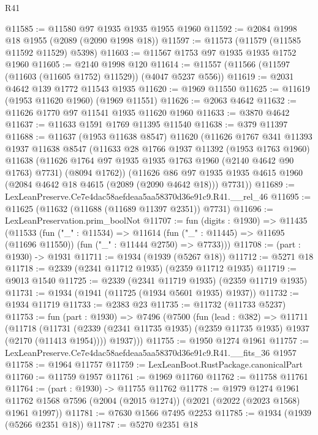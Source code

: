\begin{lexlean}{R41}
\begin{coremodule}
@11585 := @11580 @97 @1935 @1935 @1955 @1960
@11592 := @2084 @1998 @18 @1955 (@2089 (@2090 @1998 @18))
@11597 := @11573 (@11579 (@11585 @11592 @11529) @5398)
@11603 := @11567 @1753 @97 @1935 @1935 @1752 @1960
@11605 := @2140 @1998 @120
@11614 := @11557 (@11566 (@11597 (@11603 (@11605 @1752) @11529)) (@4047 @5237 @556))
@11619 := @2031 @4642 @139 @1772 @11543 @1935
@11620 := @1969 @11550
@11625 := @11619 (@1953 @11620 @1960) (@1969 @11551)
@11626 := @2063 @4642
@11632 := @11626 @1770 @97 @11541 @1935 @11620 @1960
@11633 := @3870 @4642
@11637 := @11633 @1591 @1769 @11395 @11540
@11638 := @379 @11397
@11688 := @11637
    (@1953 @11638 @8547)
    @11620
    (@11626
      @1767
      @341
      @11393
      @1937
      @11638
      @8547
      (@11633
        @28
        @1766
        @1937
        @11392
        (@1953 @1763 @1960)
        @11638
        (@11626 @1764 @97 @1935 @1935 @1763 @1960 (@2140 @4642 @90 @1763) @7731)
        (@8094 @1762))
      (@11626
        @86
        @97
        @1935
        @1935
        @4615
        @1960
        (@2084 @4642 @18 @4615 (@2089 (@2090 @4642 @18)))
        @7731))
@11689 := LexLeanPreserve.Ce7e4dac58aefdeaa5aa58370d36e91c9.R41.__rel_46
@11695 := @11625 (@11632 (@11688 (@11689 @11397 @2351)) @7731)
@11696 := LexLeanPreservation.prim_boolNot
@11707 := fun (digits : @1930) =>
  @11435
    (@11533
      (fun ("_" : @11534) =>
      @11614 (fun ("_" : @11445) => @11695 (@11696 @11550)) (fun ("_" : @11444 @2750) => @7733)))
@11708 := (part : @1930) -> @1931
@11711 := @1934 (@1939 (@5267 @18))
@11712 := @5271 @18
@11718 := @2339 (@2341 @11712 @1935) (@2359 @11712 @1935)
@11719 := @9013 @1540
@11725 := @2339 (@2341 @11719 @1935) (@2359 @11719 @1935)
@11731 := @1934 (@1941 (@11725 (@1934 @5601 @1935) @1937))
@11732 := @1934 @11719
@11733 := @2383 @23
@11735 := @11732 (@11733 @5237)
@11753 := fun (part : @1930) =>
  @7496
    (@7500
      (fun (lead : @382) =>
      @11711
        (@11718
          (@11731 (@2339 (@2341 @11735 @1935) (@2359 @11735 @1935) @1937 (@2170 (@11413 @1954))))
          @1937)))
@11755 := @1950 @1274 @1961
@11757 := LexLeanPreserve.Ce7e4dac58aefdeaa5aa58370d36e91c9.R41.__fits_36 @1957
@11758 := @1964 @11757
@11759 := LexLeanBoot.RustPackage.canonicalPart
@11760 := @11759 @1957
@11761 := @1969 @11760
@11762 := @11758 @11761
@11764 := (part : @1930) -> @11755 @11762
@11778 := @1979
    @1274
    @1961
    @11762
    @1568
    @7596
    (@2004 (@2015 @1274))
    (@2021 (@2022 (@2023 @1568) @1961 @1997))
@11781 := @7630 @1566 @7495 @2253
@11785 := @1934 (@1939 (@5266 @2351 @18))
@11787 := @5270 @2351 @18

\end{coremodule}
\end{lexlean}
